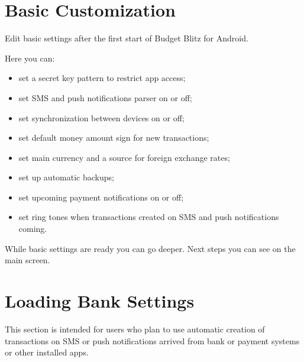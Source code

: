 \documentclass[a4paper,10pt,english]{sphinxmanual}
\begin{document}
\section{Basic Customization}
\label{\detokenize{getting-started:basic-customization}}
\sphinxAtStartPar
Edit basic settings after the first start of Budget Blitz for Android.

\noindent{}
\noindent{}
\noindent{}

\sphinxAtStartPar
Here you can:
\begin{itemize}
\item {} 
\sphinxAtStartPar
set a secret key pattern to restrict app access;

\item {} 
\sphinxAtStartPar
set SMS and push notifications parser on or off;

\item {} 
\sphinxAtStartPar
set synchronization between devices on or off;

\item {} 
\sphinxAtStartPar
set default money amount sign for new transactions;

\item {} 
\sphinxAtStartPar
set main currency and a source for foreign exchange rates;

\item {} 
\sphinxAtStartPar
set up automatic backups;

\item {} 
\sphinxAtStartPar
set upcoming payment notifications on or off;

\item {} 
\sphinxAtStartPar
set ring tones when transactions created on SMS and push notifications coming.

\end{itemize}

\sphinxAtStartPar
While basic settings are ready you can go deeper. Next steps you can see on the main screen.


\section{Loading Bank Settings}
\label{\detokenize{getting-started:loading-bank-settings}}
\sphinxAtStartPar
This section is intended for users who plan to use automatic creation of transactions on SMS or push notifications arrived
from bank or payment systems or other installed apps.
\end{document}

